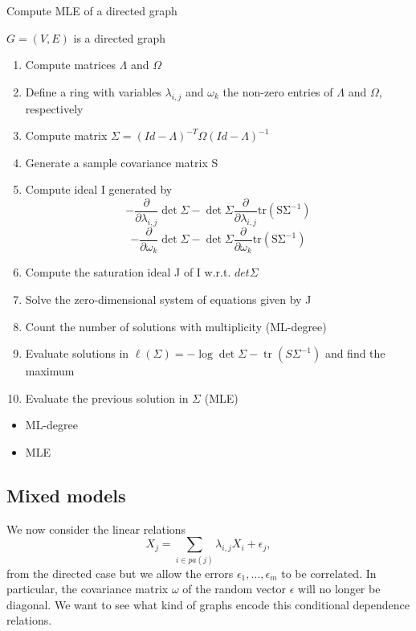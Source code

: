 \documentclass[10pt,a4paper]{article}
\begin{document}
\begin{algorithm}[H]
\caption[Aun]{Compute MLE of a directed graph}
\label{Aun}
\begin{algorithmic}
\REQUIRE $G=(V,E)$ is a directed graph
\begin{enumerate}
\item Compute matrices $\Lambda$ and $\Omega$ 
\item Define a ring with variables $\lambda_{i,j}$ and $\omega_k$ the non-zero entries of $\Lambda$ and $\Omega$, respectively 
\item Compute matrix $\Sigma=(Id-\Lambda)^{-T}\Omega(Id-\Lambda)^{-1}$
\item Generate a sample covariance matrix S
\item Compute ideal I generated by 
$$-\frac{\partial}{\partial \lambda_{i,j}} \det \Sigma-\det \Sigma\frac{\partial }{\partial \lambda_{i,j}}\operatorname{tr(S \Sigma^{-1})}$$
$$-\frac{\partial}{\partial \omega_k} \det \Sigma-\det \Sigma\frac{\partial }{\partial \omega_k}\operatorname{tr(S \Sigma^{-1})}$$
\item Compute the saturation ideal J of I w.r.t. $det \Sigma$
\item Solve the zero-dimensional system of equations given by J
\item Count the number of solutions with multiplicity (ML-degree)
\item Evaluate solutions in $\ell(\Sigma)=- \log \det \Sigma - \operatorname{tr}(S\Sigma^{-1})$ and find the maximum 
\item Evaluate the previous solution in $\Sigma$ (MLE)
\end{enumerate}

\RETURN
\begin{itemize}
\item ML-degree 
\item MLE 
\end{itemize}


\end{algorithmic}
\end{algorithm}

\subsection{Mixed models}

We now consider the linear relations 
\[X_j=\sum\limits_{i \in pa(j)}\lambda_{i,j}X_i+\epsilon_j,\]
from the directed case but we allow the errors $\epsilon_1,\dots,\epsilon_m$ to be correlated.   In particular, the covariance matrix $\omega$ of the random vector $\epsilon$ will no longer be diagonal. We want to see what kind of graphs encode this conditional dependence relations.
\end{document}
